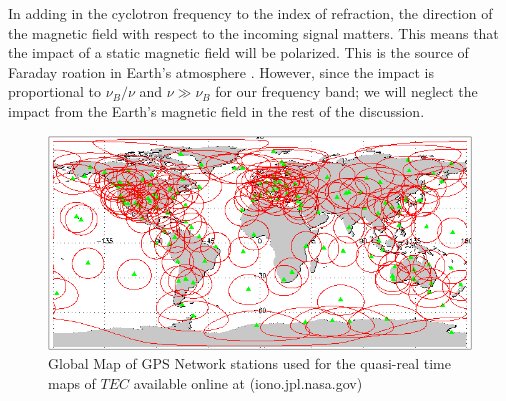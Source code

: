 In adding in the cyclotron frequency to the index of refraction, the direction of the magnetic field with respect to the incoming signal matters. This means that the impact of a static magnetic field will be polarized. This is the source of Faraday roation in Earth's atmosphere \cite{thompson_2001}. However, since the impact is proportional to $\nu_B/\nu$ and $\nu \gg \nu_B$ for our frequency band; we will neglect the impact from the Earth's magnetic field in the rest of the discussion. 


\begin{figure}[htb]
\begin{center}
\includegraphics[width=0.95\linewidth]{Ionosphere/figures/gps_sitemap.png}
\caption{Global Map of GPS Network stations used for the quasi-real time maps of $TEC$ available online at (iono.jpl.nasa.gov)}
\label{Fig:gps_stat}
\end{center}
\end{figure}

